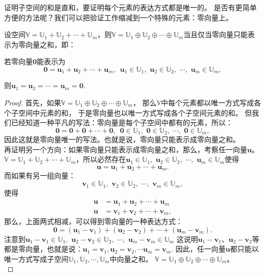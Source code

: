 \documentclass[12pt,UTF8,fontset=none]{ctexbook}
\begin{document}
证明子空间的和是直和，要证明每个元素的表达方式都是唯一的。
是否有更简单方便的方法呢？我们可以把验证工作缩减到一个特殊的元素：零向量上。
\begin{pp}\label{pp:1_8}
    设空间$\mathbb{V} = \mathbb{U}_1 + \mathbb{U}_2 + \cdots + \mathbb{U}_m$，则$\mathbb{V} = \mathbb{U}_1 \oplus \mathbb{U}_2 \oplus \cdots \oplus \mathbb{U}_m$当且仅当零向量只能表示为零向量之和，即：

    若零向量$\mathbf{0}$能表示为
    $$ \mathbf{0} = \mathbf{u}_1 + \mathbf{u}_2 + \cdots + \mathbf{u}_m,\,\,\, \mathbf{u}_1\in \mathbb{U}_1,\,\,\mathbf{u}_2\in \mathbb{U}_2,\,\,\cdots,\,\,\mathbf{u}_m\in \mathbb{U}_m, $$
    
    则$\mathbf{u}_1 = \mathbf{u}_2 = \cdots = \mathbf{u}_m = \mathbf{0}.$
\end{pp}
\begin{proof} %
    首先，如果$\mathbb{V} = \mathbb{U}_1 \oplus \mathbb{U}_2 \oplus \cdots \oplus \mathbb{U}_m$，
    那么$\mathbb{V}$中每个元素都以唯一方式写成各个子空间中元素的和，
    于是零向量也以唯一方式写成各个子空间元素的和。
    但我们已经知道一种平凡的写法：零向量是每个子空间中都有的元素，所以：
    $$ \mathbf{0} = \mathbf{0} + \mathbf{0} + \cdots + \mathbf{0},\,\,\, \mathbf{0}\in \mathbb{U}_1,\,\,\mathbf{0}\in \mathbb{U}_2,\,\,\cdots,\,\,\mathbf{0}\in \mathbb{U}_m, $$
    因此这就是零向量唯一的写法。也就是说，零向量只能表示成零向量之和。\\
    再证明另一个方向：如果零向量只能表示成零向量之和，那么，考察任一向量$\mathbf{u}$。\\
    $\mathbb{V} = \mathbb{U}_1 + \mathbb{U}_2 + \cdots + \mathbb{U}_m$，所以必然存在$\mathbf{u}_1\in \mathbb{U}_1,\,\,\mathbf{u}_2\in \mathbb{U}_2,\,\,\cdots,\,\,\mathbf{u}_m\in \mathbb{U}_m$使得
    $$ \mathbf{u} = \mathbf{u}_1 + \mathbf{u}_2 + \cdots + \mathbf{u}_m.$$
    而如果有另一组向量：
    $$\mathbf{v}_1\in \mathbb{U}_1,\,\,\mathbf{v}_2\in \mathbb{U}_2,\,\,\cdots,\,\,\mathbf{v}_m\in \mathbb{U}_m, $$
    使得
    \begin{align*} 
        \mathbf{u} &= \mathbf{u}_1 + \mathbf{u}_2 + \cdots + \mathbf{u}_m  \\
        \mathbf{u} &= \mathbf{v}_1 + \mathbf{v}_2 + \cdots + \mathbf{v}_m, 
    \end{align*}
    那么，上面两式相减，可以得到零向量的一种表达方式：
    $$ \mathbf{0} = (\mathbf{u}_1 - \mathbf{v}_1) + (\mathbf{u}_2 - \mathbf{v}_2) + \cdots + (\mathbf{u}_m - \mathbf{v}_m). $$
    注意到$\mathbf{u}_1 - \mathbf{v}_1\in \mathbb{U}_1,\,\,\mathbf{u}_2 - \mathbf{v}_2\in \mathbb{U}_2,\,\,\cdots,\,\,\mathbf{u}_m - \mathbf{v}_m\in \mathbb{U}_m$
    这说明$\mathbf{u}_1 - \mathbf{v}_1$、$\mathbf{u}_2 - \mathbf{v}_2$等都是零向量，也就是说：$ \mathbf{u}_1 = \mathbf{v}_1, \mathbf{u}_2 = \mathbf{v}_2, \cdots \mathbf{u}_m = \mathbf{v}_m.$
    因此，任一向量$\mathbf{u}$都只能以唯一方式写成子空间$\mathbb{U}_1, \mathbb{U}_2, \cdots, \mathbb{U}_m$中向量之和。
    $\mathbb{V} = \mathbb{U}_1 \oplus \mathbb{U}_2 \oplus \cdots \oplus \mathbb{U}_m$。\\
\end{proof}
\end{document}
